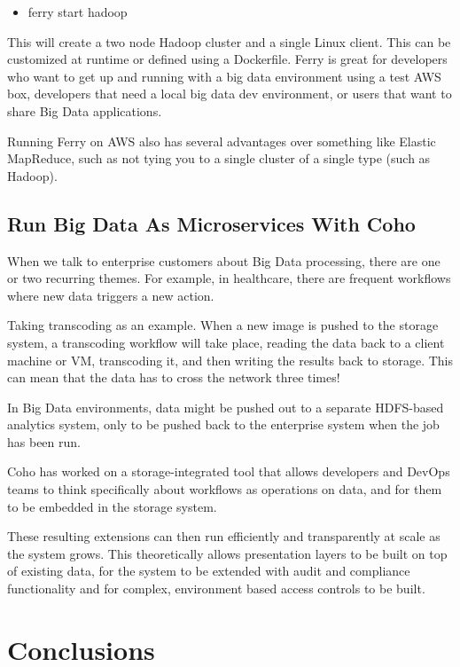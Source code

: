 \documentclass[sigconf]{acmart}
\begin{document}
	\begin{itemize}
		\item[] ferry start hadoop
	\end{itemize}	
	
	
	This will create a two node Hadoop cluster and a single Linux client. This can be customized at runtime or defined using a Dockerfile.
	Ferry is great for developers who want to get up and running with a big data environment using a test AWS box, developers that need a local big data dev environment, or users that want to share Big Data applications.
	
	Running Ferry on AWS also has several advantages over something like Elastic MapReduce, such as not tying you to a single cluster of a single type (such as Hadoop).
	
	\subsection{Run Big Data As Microservices With Coho}
	When we talk to enterprise customers about Big Data processing, there are one or two recurring themes. For example, in healthcare, there are frequent workflows where new data triggers a new action.
	
	Taking transcoding as an example. When a new image is pushed to the storage system, a transcoding workflow will take place, reading the data back to a client machine or VM, transcoding it, and then writing the results back to storage. This can mean that the data has to cross the network three times!
	
	In Big Data environments, data might be pushed out to a separate HDFS-based analytics system, only to be pushed back to the enterprise system when the job has been run.\cite{Coho}
	
	Coho has worked on a storage-integrated tool that allows developers and DevOps teams to think specifically about workflows as operations on data, and for them to be embedded in the storage system.
	
	These resulting extensions can then run efficiently and transparently at scale as the system grows. This theoretically allows presentation layers to be built on top of existing data, for the system to be extended with audit and compliance functionality and for complex, environment based access controls to be built.
	
	\section{Conclusions}
	
\end{document}
